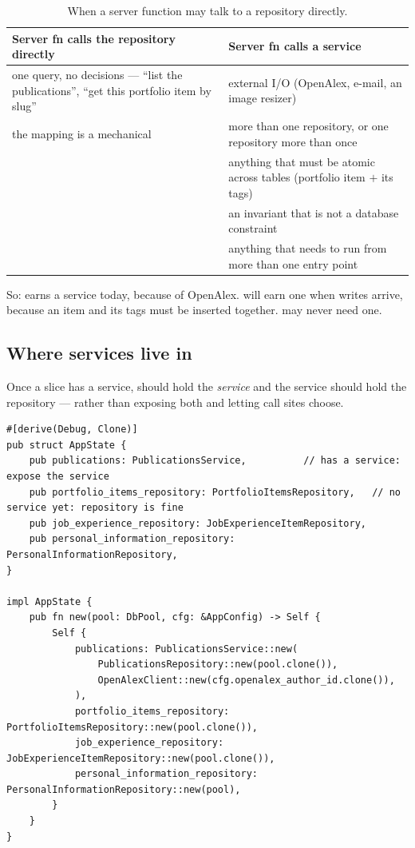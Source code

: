 \begin{table}[htbp]
\centering
\caption{When a server function may talk to a repository directly.}
\label{tab:needservice}
\small
\begin{tabular}{@{}L{0.44\textwidth}L{0.50\textwidth}@{}}
\toprule
\textbf{Server fn calls the repository directly} & \textbf{Server fn calls a service} \\
\midrule
one query, no decisions --- ``list the publications'', ``get this portfolio item by slug'' &
external I/O (OpenAlex, e-mail, an image resizer) \\
the mapping is a mechanical  &
more than one repository, or one repository more than once \\
&
anything that must be atomic across tables (portfolio item $+$ its tags) \\
&
an invariant that is not a database constraint \\
&
anything that needs to run from more than one entry point \\
\bottomrule
\end{tabular}
\end{table}

So:  earns a service today, because of OpenAlex.  will earn one
when writes arrive, because an item and its tags must be inserted together.
 may never need one.

\subsection{Where services live in }

Once a slice has a service,  should hold the \emph{service} and the service should
hold the repository --- rather than exposing both and letting call sites choose.

\begin{lstlisting}[style=rs,caption={\file{application\_state.rs}, evolved. Same shape you already
built, one layer up.}]
#[derive(Debug, Clone)]
pub struct AppState {
    pub publications: PublicationsService,          // has a service: expose the service
    pub portfolio_items_repository: PortfolioItemsRepository,   // no service yet: repository is fine
    pub job_experience_repository: JobExperienceItemRepository,
    pub personal_information_repository: PersonalInformationRepository,
}

impl AppState {
    pub fn new(pool: DbPool, cfg: &AppConfig) -> Self {
        Self {
            publications: PublicationsService::new(
                PublicationsRepository::new(pool.clone()),
                OpenAlexClient::new(cfg.openalex_author_id.clone()),
            ),
            portfolio_items_repository: PortfolioItemsRepository::new(pool.clone()),
            job_experience_repository: JobExperienceItemRepository::new(pool.clone()),
            personal_information_repository: PersonalInformationRepository::new(pool),
        }
    }
}
\end{lstlisting}


